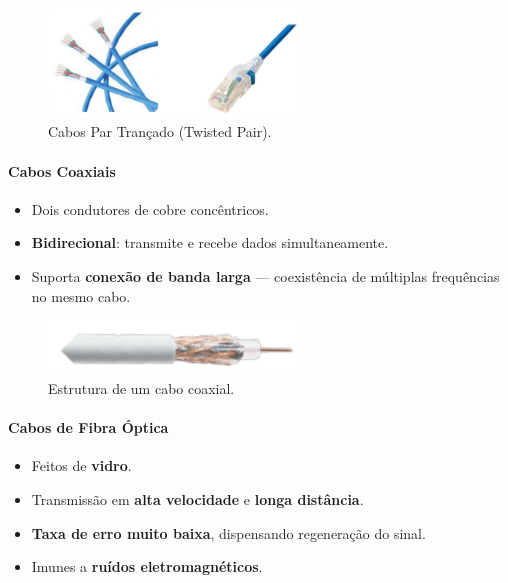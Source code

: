    \begin{figure}[H]
        \centering
        \includegraphics[width=0.6\textwidth]{img/cap-01/cabos-tp.png}
        \caption{Cabos Par Trançado (Twisted Pair).}
    \end{figure}

    \paragraph{Cabos Coaxiais}
    \begin{itemize}
        \item Dois condutores de cobre concêntricos.
        \item \textbf{Bidirecional}: transmite e recebe dados simultaneamente.
        \item Suporta \textbf{conexão de banda larga} — coexistência de múltiplas frequências no mesmo cabo.
    \end{itemize}

    \begin{figure}[H]
        \centering
        \includegraphics[width=0.6\textwidth]{img/cap-01/cabo-coaxial.png}
        \caption{Estrutura de um cabo coaxial.}
    \end{figure}

    \paragraph{Cabos de Fibra Óptica}
    \begin{itemize}
        \item Feitos de \textbf{vidro}.
        \item Transmissão em \textbf{alta velocidade} e \textbf{longa distância}.
        \item \textbf{Taxa de erro muito baixa}, dispensando regeneração do sinal.
        \item Imunes a \textbf{ruídos eletromagnéticos}.
    \end{itemize}

